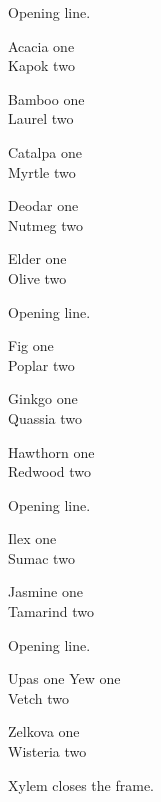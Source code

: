 \documentclass{beamer}
\begin{document}
\begin{frame}[t]
Opening line.

{\tiny Acacia one\\Kapok two\par}

{\scriptsize Bamboo one\\Laurel two\par}

{\footnotesize Catalpa one\\Myrtle two\par}

{\small Deodar one\\Nutmeg two\par}

{\normalsize Elder one\\Olive two\par}
\end{frame}
\begin{frame}[t]
Opening line.

{\large Fig one\\Poplar two\par}

{\Large Ginkgo one\\Quassia two\par}

{\LARGE Hawthorn one\\Redwood two\par}
\end{frame}
\begin{frame}[t]
Opening line.

{\huge Ilex one\\Sumac two\par}

{\Huge Jasmine one\\Tamarind two\par}
\end{frame}
\begin{frame}[t]
Opening line.

Upas one {\small Yew} one\\Vetch two\par

{\small Zelkova one\\Wisteria two}\par

Xylem closes the frame.
\end{frame}
\end{document}

